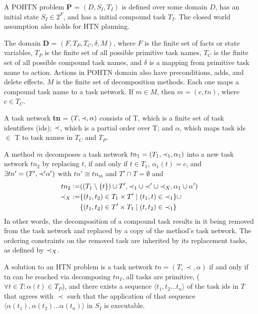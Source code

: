 A POHTN problem \textbf{P} = $(D, S_I, T_I)$
is defined over some domain $D$, 
has an initial state $S_I \in 2^F$, and 
has a initial compound task $T_I$. 
The closed world assumption also holds for HTN planning.

The domain \textbf{D} = $(F, T_P, T_C, \delta, M)$, where
$F$ is the finite set of facts or state variables, $T_P$ is the finite set of all possible primitive task names, $T_C$ is the finite set of all possible compound task names, and
$\delta$ is a mapping from primitive task name to action. Actions in POHTN domain also have preconditions, adds, and delete effects.
$M$ is the finite set of decomposition methods. Each one maps a compound task name to a task network. If $m \in M$, then $m=(c, tn)$, where $c \in T_C$.

A task network \textbf{tn} = $(T, \mathit{ \mathord{\prec} }, \alpha)$ consists of
T, which is a finite set of task identifiers (ids); 
$\mathit{ \mathord{\prec} }$, which is a partial order over T; and
$\alpha$, which maps task ids $\in$ T to task names in $T_C$ and $T_P$. 

A method $m$ decomposes a task network $tn_1 = (T_1, \mathit{ \mathord{\prec} }_1, \alpha_1)$ into
a new task network $tn_2$ by replacing $t$, if and only if $t \in T_1$, $\alpha_1(t) = c$, and $\exists tn' = (T', \mathit{ \mathord{\prec} }' \alpha')$ with $tn' \cong tn_m$ and $T' \cap T = \emptyset$ and
\begin{align}
tn_2 :=     &((T_1 \setminus \{t\}) \cup T',    \mathit{ \mathord{\prec} }_1 \cup \mathit{ \mathord{\prec} }' \cup \mathit{ \mathord{\prec} }_X,        \alpha_1 \cup \alpha') \\
\mathit{ \mathord{\prec} }_X :=  &\{(t_1, t_2) \in T_1 \times T'  \mid  (t_1,t) \in \mathit{ \mathord{\prec} }_1 \} \cup \\
&\{(t_1, t_2) \in T' \times T_1 \mid (t, t_2) \in \mathit{ \mathord{\prec} }_1 \}  
\end{align}
In other words, the decomposition of a compound task results in it being removed from the task network and replaced by a copy of the method’s task network. The ordering constraints
on the removed task are inherited by its replacement tasks, as defined by $\mathit{ \mathord{\prec} }_X$. 

A solution to an HTN problem is a task network $tn = (T, \prec, \alpha)$ if and only if
tn can be reached via decomposing $tn_I$, all tasks are primitive, ($\forall t \in T: \alpha(t) \in T_P$), and there exists a sequence $\langle t_1, t_2 ... t_n \rangle$ of the task ids in $T$ that agrees with $\prec$ such that the application of that sequence $\langle \alpha(t_1), \alpha(t_2) ... \alpha(t_n) \rangle$ in $S_I$ is executable.

